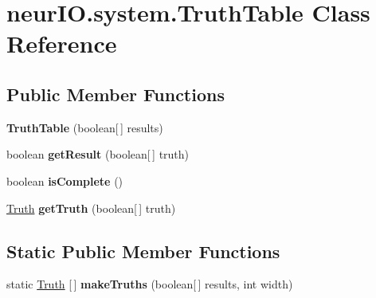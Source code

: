 \hypertarget{classneur_i_o_1_1system_1_1_truth_table}{}\section{neur\+I\+O.\+system.\+Truth\+Table Class Reference}
\label{classneur_i_o_1_1system_1_1_truth_table}
\subsection*{Public Member Functions}
\begin{DoxyCompactItemize}
\item 
\mbox{\label{classneur_i_o_1_1system_1_1_truth_table_a9a4e5d68d6f275a51c7af28c5e4f11c2}} 
{\bfseries Truth\+Table} (boolean\mbox{[}$\,$\mbox{]} results)
\item 
\mbox{\label{classneur_i_o_1_1system_1_1_truth_table_a47bb5f7ba445758e1b892e079c501212}} 
boolean {\bfseries get\+Result} (boolean\mbox{[}$\,$\mbox{]} truth)
\item 
\mbox{\label{classneur_i_o_1_1system_1_1_truth_table_a0932bf77d2e3e05e0a317f8003e67e53}} 
boolean {\bfseries is\+Complete} ()
\item 
\mbox{\label{classneur_i_o_1_1system_1_1_truth_table_a855f811de0244489c48772a0511b48ce}} 
\hyperlink{classneur_i_o_1_1system_1_1_truth}{Truth} {\bfseries get\+Truth} (boolean\mbox{[}$\,$\mbox{]} truth)
\end{DoxyCompactItemize}
\subsection*{Static Public Member Functions}
\begin{DoxyCompactItemize}
\item 
\mbox{\label{classneur_i_o_1_1system_1_1_truth_table_a1146ea2f3e41f379b920947a2ad840d8}} 
static \hyperlink{classneur_i_o_1_1system_1_1_truth}{Truth} \mbox{[}$\,$\mbox{]} {\bfseries make\+Truths} (boolean\mbox{[}$\,$\mbox{]} results, int width)
\end{DoxyCompactItemize}
